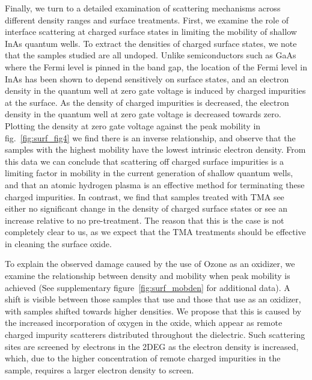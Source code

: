 Finally, we turn to a detailed examination of scattering mechanisms across different density ranges and surface treatments. First, we examine the role of interface scattering at charged surface states in limiting the mobility of shallow InAs quantum wells. To extract the densities of charged surface states, we note that the samples studied are all undoped. Unlike semiconductors such as GaAs where the Fermi level is pinned in the band gap, the location of the Fermi level in InAs has been shown to depend sensitively on surface states, and an electron density in the quantum well at zero gate voltage is induced by charged impurities at the surface\cite{PhysRevLett.66.2243,Affentauschegg_2001}. As the density of charged impurities is decreased, the electron density in the quantum well at zero gate voltage is decreased towards zero. Plotting the density at zero gate voltage against the peak mobility in fig.~\ref{fig:surf_fig4} we find there is an inverse relationship, and observe that the samples with the highest mobility have the lowest intrinsic electron density. From this data we can conclude that scattering off charged surface impurities is a limiting factor in mobility in the current generation of shallow quantum wells, and that an atomic hydrogen plasma is an effective method for terminating these charged impurities. In contrast, we find that samples treated with TMA see either no significant change in the density of charged surface states or see an increase relative to no pre-treatment. The reason that this is the case is not completely clear to us, as we expect that the TMA treatments should be effective in cleaning the surface oxide.

To explain the observed damage caused by the use of Ozone as an oxidizer, we examine the relationship between density and mobility when peak mobility is achieved (See supplementary figure~\ref{fig:surf_mobden} for additional data). A shift is visible between those samples that use  and those that use  as an oxidizer, with  samples shifted towards higher densities. We propose that this is caused by the increased incorporation of oxygen in the oxide\cite{10.1021/cm0608903}, which appear as remote charged impurity scatterers\cite{scattering} distributed throughout the dielectric. Such scattering sites are screened by electrons in the 2DEG as the electron density is increased, which, due to the higher concentration of remote charged impurities in the sample, requires a larger electron density to screen.

